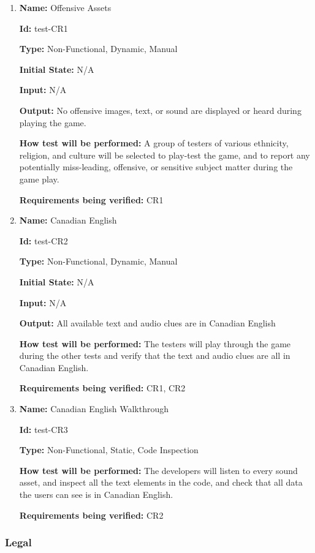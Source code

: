 \documentclass[12pt, titlepage]{article}
\begin{document}
\begin{enumerate}

\item{\textbf{Name:} Offensive Assets}

\textbf{Id:} test-CR1

\textbf{Type:} Non-Functional, Dynamic, Manual
					
\textbf{Initial State:} N/A
					
\textbf{Input:} N/A
					
\textbf{Output:} No offensive images, text, or sound are displayed or heard during playing the game.
					
\textbf{How test will be performed:} A group of testers of various ethnicity, religion, and culture will be selected to play-test the game, and to report any potentially miss-leading, offensive, or sensitive subject matter during the game play.  

\textbf{Requirements being verified:} CR1
					
\item{\textbf{Name:} Canadian English}

\textbf{Id:} test-CR2

\textbf{Type:} Non-Functional, Dynamic, Manual
					
\textbf{Initial State:} N/A
					
\textbf{Input:} N/A
					
\textbf{Output:} All available text and audio clues are in Canadian English
					
\textbf{How test will be performed:} The testers will play through the game during the other tests and verify that the text and audio clues are all in Canadian English. 

\textbf{Requirements being verified:} CR1, CR2

\item{\textbf{Name:} Canadian English Walkthrough}

\textbf{Id:} test-CR3

\textbf{Type:} Non-Functional, Static, Code Inspection
									
\textbf{How test will be performed:} The developers will listen to every sound asset, and inspect all the text elements in the code, and check that all data the users can see is in Canadian English.

\textbf{Requirements being verified:} CR2

\end{enumerate}

\subsubsection{Legal}
\end{document}
